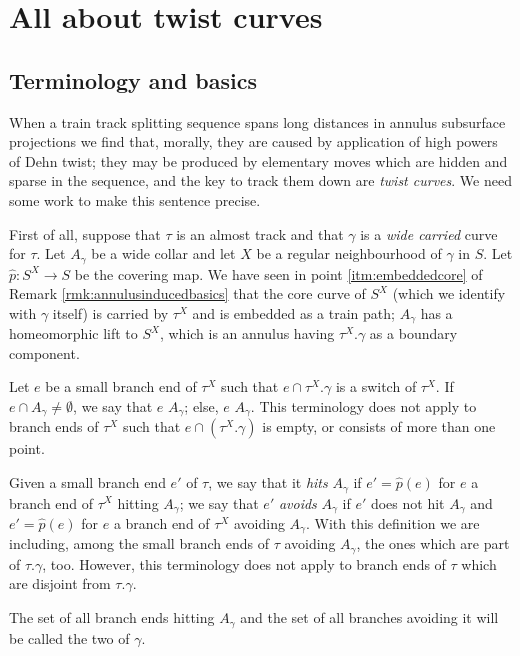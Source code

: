 \section{All about twist curves}\label{sec:twistcurves}

\subsection{Terminology and basics}

When a train track splitting sequence spans long distances in annulus subsurface projections we find that, morally, they are caused by application of high powers of Dehn twist; they may be produced by elementary moves which are hidden and sparse in the sequence, and the key to track them down are \emph{twist curves}. We need some work to make this sentence precise.

First of all, suppose that $\tau$ is an almost track and that $\gamma$ is a \emph{wide carried} curve for $\tau$. Let $A_\gamma$ be a wide collar and let $X$ be a regular neighbourhood of $\gamma$ in $S$. Let $\hat p:S^X\rightarrow S$ be the covering map. We have seen in point \ref{itm:embeddedcore} of Remark \ref{rmk:annulusinducedbasics} that the core curve of $S^X$ (which we identify with $\gamma$ itself) is carried by $\tau^X$ and is embedded as a train path; $A_\gamma$ has a homeomorphic lift to $S^X$, which is an annulus having $\tau^X.\gamma$ as a boundary component.

\begin{defin}
Let $e$ be a small branch end of $\tau^X$ such that $e\cap\tau^X.\gamma$ is a switch of $\tau^X$. If $e\cap A_\gamma\not=\emptyset$, we say that $e$  $A_\gamma$; else, $e$  $A_\gamma$. This terminology does not apply to branch ends of $\tau^X$ such that $e\cap(\tau^X.\gamma)$ is empty, or consists of more than one point.

Given a small branch end $e'$ of $\tau$, we say that it \emph{hits} $A_\gamma$ if $e'=\hat p(e)$ for $e$ a branch end of $\tau^X$ hitting $A_\gamma$; we say that $e'$ \emph{avoids} $A_\gamma$ if $e'$ does not hit $A_\gamma$ and $e'=\hat p(e)$ for $e$ a branch end of $\tau^X$ avoiding $A_\gamma$. With this definition we are including, among the small branch ends of $\tau$ avoiding $A_\gamma$, the ones which are part of $\tau.\gamma$, too. However, this terminology does not apply to branch ends of $\tau$ which are disjoint from $\tau.\gamma$.

The set of all branch ends hitting $A_\gamma$ and the set of all branches avoiding it will be called the two  of $\gamma$. 
\end{defin}

